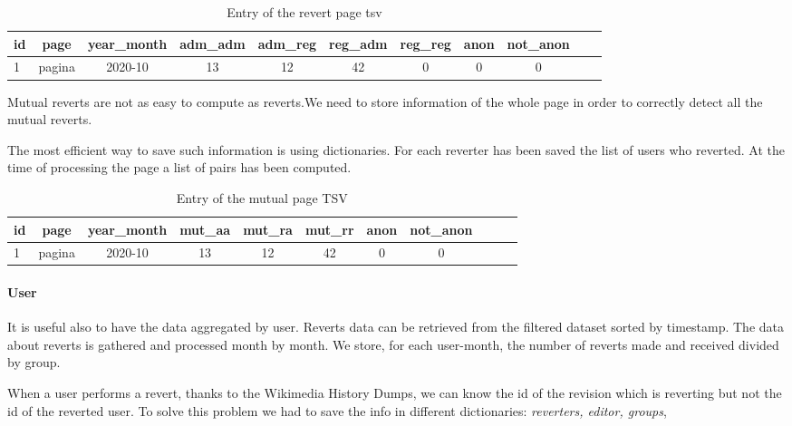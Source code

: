 \begin{table}[H]
    \centering
    \begin{tabularx}{\columnwidth}{@{}Xcccccccccc@{}}
        \midrule
        \textbf{id} & \textbf{page} & \textbf{year\_month} & \textbf{adm\_adm} & \textbf{adm\_reg} & \textbf{reg\_adm} & \textbf{reg\_reg} & \textbf{anon} & \textbf{not\_anon}\\ \toprule
        1 & pagina & 2020-10 & 13 & 12 & 42 & 0 & 0 & 0 \\
        
         \bottomrule
    \end{tabularx}
    
    \caption{Entry of the revert page tsv \label{table:revertpage}}
\end{table}

Mutual reverts are not as easy to compute as reverts.We need to store information of the whole page
in order to correctly detect all the mutual reverts.

The most efficient way to save such information is using dictionaries. For each reverter has been
saved the list of users who reverted. At the time of processing the page a list of pairs has been
computed.

\begin{table}[H]
    \centering
    \begin{tabularx}{\columnwidth}{@{}Xcccccccccc@{}}
        \midrule
        \textbf{id} & \textbf{page} & \textbf{year\_month} & \textbf{mut\_aa} & \textbf{mut\_ra}  & \textbf{mut\_rr} & \textbf{anon} & \textbf{not\_anon}\\ \toprule
        1 & pagina & 2020-10 & 13 & 12 & 42  & 0 & 0 \\
         \bottomrule
    \end{tabularx}
    
    \caption{Entry of the mutual page TSV \label{table:mutualpage}}
\end{table}

\paragraph*{User}
It is useful also to have the data aggregated by user. Reverts data can be retrieved from the
filtered dataset sorted by timestamp. The data about reverts is gathered and processed month by
month. We store, for each user-month, the number of reverts made and received divided by group.

When a user performs a revert, thanks to the Wikimedia History Dumps, we can know the id of the
revision which is reverting but not the id of the reverted user. To solve this problem we
had to save the info in different dictionaries: \textit{reverters, editor, groups}, 
\bigskip


